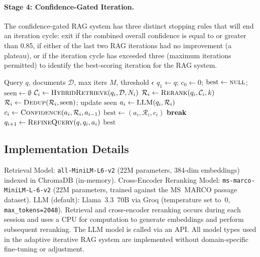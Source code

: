 \documentclass[11pt,a4paper]{article}
\begin{document}
\paragraph{Stage 4: Confidence-Gated Iteration.}
The confidence-gated RAG system has three distinct stopping rules
that will end an iteration cycle: exit if the combined overall
confidence is equal to or greater than 0.85, if either of the last
two RAG iterations had no improvement (a plateau), or if the
iteration cycle has exceeded three (maximum iterations permitted) to
identify the best-scoring iteration for the RAG system.

\begin{algorithm}[t]
\caption{Adaptive Iterative RAG}
\label{alg:adaptive}
\begin{algorithmic}[1]
\Require Query $q$, documents $\mathcal{D}$, max iters $M$, threshold $\epsilon$
\State $q_1 \gets q$; $c_0 \gets 0$; $\text{best} \gets \textsc{null}$; $\text{seen} \gets \emptyset$
    \State $\mathcal{C}_i \gets \textsc{HybridRetrieve}(q_i, \mathcal{D}, N_i)$
    \State $\mathcal{R}_i \gets \textsc{Rerank}(q_i, \mathcal{C}_i, k)$
    \State $\mathcal{R}_i \gets \textsc{Dedup}(\mathcal{R}_i, \text{seen})$; update $\text{seen}$
    \State $a_i \gets \textsc{LLM}(q_i, \mathcal{R}_i)$
    \State $c_i \gets \textsc{Confidence}(a_i, \mathcal{R}_i, a_{i-1})$
     $\text{best} \gets (a_i, \mathcal{R}_i, c_i)$ \EndIf
     \textbf{break} \EndIf
    \State $q_{i+1} \gets \textsc{RefineQuery}(q, q_i, a_i)$
\EndFor
\State \Return $\text{best}$
\end{algorithmic}
\end{algorithm}

\subsection{Implementation Details}

Retrieval Model: \texttt{all-MiniLM-L6-v2} (22M parameters,
384-dim embeddings) indexed in ChromaDB (in-memory).
Cross-Encoder Reranking Model: \texttt{ms-marco-MiniLM-L-6-v2}
(22M parameters, trained against the MS~MARCO passage dataset).
LLM (default): Llama~3.3~70B via Groq (temperature set to~0,
\texttt{max\_tokens=2048}).
Retrieval and cross-encoder reranking occurs during each session and
uses a CPU for computation to generate embeddings and perform
subsequent reranking.
The LLM model is called via an API.
All model types used in the adaptive iterative RAG system are
implemented without domain-specific fine-tuning or adjustment.
\end{document}
